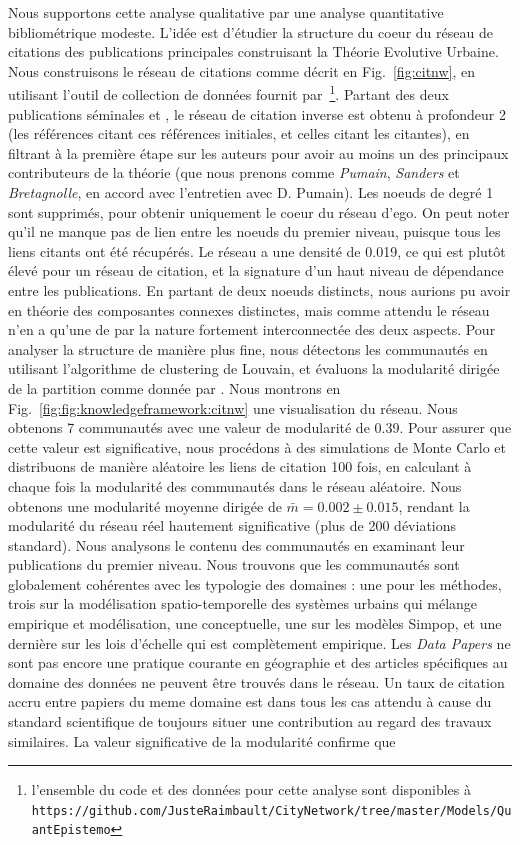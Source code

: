 {}{
Nous supportons cette analyse qualitative par une analyse quantitative bibliométrique modeste. L'idée est d'étudier la structure du coeur du réseau de citations des publications principales construisant la Théorie Evolutive Urbaine. Nous construisons le réseau de citations comme décrit en Fig.~\ref{fig:citnw}, en utilisant l'outil de collection de données fournit par~\cite{raimbault2016indirect}\footnote{l'ensemble du code et des données pour cette analyse sont disponibles à \\\texttt{https://github.com/JusteRaimbault/CityNetwork/tree/master/Models/QuantEpistemo}}. Partant des deux publications séminales \cite{pumain1997pour} et \cite{sanders1997simpop}, le réseau de citation inverse est obtenu à profondeur 2 (les références citant ces références initiales, et celles citant les citantes), en filtrant à la première étape sur les auteurs pour avoir au moins un des principaux contributeurs de la théorie (que nous prenons comme \emph{Pumain}, \emph{Sanders} et \emph{Bretagnolle}, en accord avec l'entretien avec D. Pumain). Les noeuds de degré 1 sont supprimés, pour obtenir uniquement le coeur du réseau d'ego. On peut noter qu'il ne manque pas de lien entre les noeuds du premier niveau, puisque tous les liens citants ont été récupérés. Le réseau a une densité de 0.019, ce qui est plutôt élevé pour un réseau de citation, et la signature d'un haut niveau de dépendance entre les publications. En partant de deux noeuds distincts, nous aurions pu avoir en théorie des composantes connexes distinctes, mais comme attendu le réseau n'en a qu'une de par la nature fortement interconnectée des deux aspects. Pour analyser la structure de manière plus fine, nous détectons les communautés en utilisant l'algorithme de clustering de Louvain, et évaluons la modularité dirigée de la partition comme donnée par \cite{nicosia2009extending}. Nous montrons en Fig.~\ref{fig:fig:knowledgeframework:citnw} une visualisation du réseau. Nous obtenons 7 communautés avec une valeur de modularité de 0.39. Pour assurer que cette valeur est significative, nous procédons à des simulations de Monte Carlo et distribuons de manière aléatoire les liens de citation 100 fois, en calculant à chaque fois la modularité des communautés dans le réseau aléatoire. Nous obtenons une modularité moyenne dirigée de $\bar{m} = 0.002 \pm 0.015$, rendant la modularité du réseau réel hautement significative (plus de 200 déviations standard). Nous analysons le contenu des communautés en examinant leur publications du premier niveau. Nous trouvons que les communautés sont globalement cohérentes avec les typologie des domaines : une pour les méthodes, trois sur la modélisation spatio-temporelle des systèmes urbains qui mélange empirique et modélisation, une conceptuelle, une sur les modèles Simpop, et une dernière sur les lois d'échelle qui est complètement empirique. Les \emph{Data Papers} ne sont pas encore une pratique courante en géographie et des articles spécifiques au domaine des données ne peuvent être trouvés dans le réseau. Un taux de citation accru entre papiers du meme domaine est dans tous les cas attendu à cause du standard scientifique de toujours situer une contribution au regard des travaux similaires. La valeur significative de la modularité confirme que }
